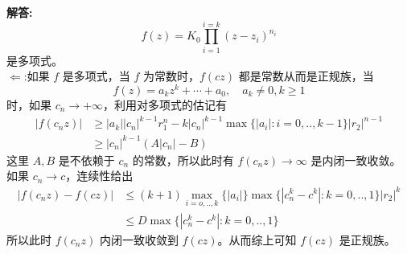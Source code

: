 \documentclass[12pt, a4paper, oneside]{ctexart}
\newenvironment{solution}{\par\noindent\textbf{解答:}}{\par}
\begin{document}
\begin{solution}
\begin{equation*}
        f(z) = K_{0}\prod_{i=1}^{i=k}(z-z_{i})^{n_{i}}
    \end{equation*}
    是多项式。\\
    $\Leftarrow$:如果 $f$ 是多项式，当 $f$ 为常数时，$f(cz)$ 都是常数从而是正规族，当
    \begin{equation*}
        f(z) = a_{k}z^{k} + \cdots + a_{0},\quad a_{k} \not= 0,k\ge 1
    \end{equation*}
    时，如果 $c_{n} \to +\infty$，利用对多项式的估记有
    \begin{align*}
        |f(c_{n}z)| &\ge |a_{k}||c_{n}|^{k-1}r_{1}^{n}- k|c_{n}|^{k-1}\max\{|a_{i}|:i=0,..,k-1\}|r_{2}|^{n-1} \\
                    &\ge |c_{n}|^{k-1}(A|c_{n}|-B)
    \end{align*}
    这里 $A,B$ 是不依赖于 $c_{n}$ 的常数，所以此时有 $f(c_{n}z) \to \infty$ 是内闭一致收敛。如果 $c_{n} \to c$，连续性给出
    \begin{align*}
        |f(c_{n}z)-f(cz)| &\le (k+1)\max_{i=o,..,k}\{|a_{i}|\}\max\{|c_{n}^{k}-c^{k}|:k=0,..,1\}|r_{2}|^{k} \\
                          &\le D \max\{|c_{n}^{k}-c^{k}|:k=0,..,1\}
    \end{align*}
    所以此时 $f(c_{n}z)$ 内闭一致收敛到 $f(cz)$。从而综上可知 $f(cz)$ 是正规族。
\end{solution}
\end{document}
